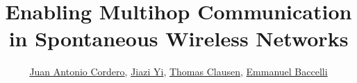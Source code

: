 \documentclass{article}
\theoremstyle{plain}
\begin{document}
\title{Enabling Multihop Communication in Spontaneous Wireless Networks}
\author{\href{http://www.lix.polytechnique.fr/~cordero/index_en.htm}{Juan Antonio Cordero}, \href{http://www.jiaziyi.com/}{Jiazi Yi}, \href{http://www.thomasclausen.org/}{Thomas Clausen}, \href{http://www.emmanuelbaccelli.org/}{Emmanuel Baccelli}}

\date{}

\copyrightstatement

\pagestyle{empty}

\maketitle


\thispagestyle{empty}







%











%





%




\glsaddall
\printglossaries

\end{document}
